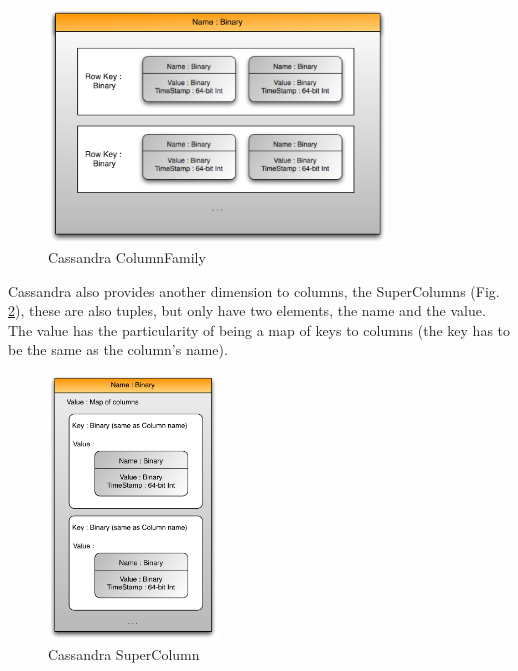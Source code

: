 \begin{figure}[!htb]
  \begin{center}
    \leavevmode
    \includegraphics[width=0.8\textwidth]{images/columnfamily}
  \end{center}
  \caption{Cassandra ColumnFamily}
  \label{fig:columnfamily}
\end{figure}


Cassandra also provides another dimension to columns, the SuperColumns (Fig. \ref{fig:supercolumn}), these are also tuples, but only have two elements, the name and the value. The value has the particularity of being a map of keys to columns (the key has to be the same as the column's name).

\begin{figure}[htb]
  \begin{center}
    \leavevmode
    \includegraphics[width=0.4\textwidth]{images/supercolumn}
  \end{center}
  \caption{Cassandra SuperColumn}
  \label{fig:supercolumn}
\end{figure}

